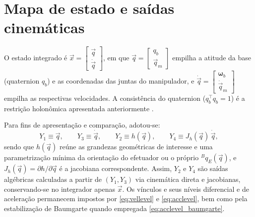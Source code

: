 \section{Mapa de estado e saídas cinemáticas}

O estado integrado é
$\vec x=\begin{bmatrix}\vec q\\ \dot{\vec q}\end{bmatrix}$,
em que $\vec q=\begin{bmatrix} q_b \\ \vec q_m \end{bmatrix}
$ empilha a atitude da base (quaternion $q_b$) e as coordenadas das juntas do manipulador, e
$\dot{\vec q}=\begin{bmatrix} \boldsymbol\omega_b \\ \dot{\vec q}_m \end{bmatrix}$
empilha as respectivas velocidades. 
A consistência do quaternion ($q_b^{\top}q_b=1$)
é a restrição holonômica apresentada anteriormente
.

Para fins de apresentação e comparação, adotou-se: 
\begin{equation}
Y_1 \equiv \vec q,\qquad
Y_3 \equiv \dot{\vec q},\qquad
Y_2 \equiv h(\vec q),\qquad
Y_4 \equiv J_h(\vec q)\,\dot{\vec q},
\label{eq:mapa_estado}
\end{equation}
sendo que $h(\vec q)$ reúne as grandezas geométricas de interesse e uma parametrização mínima da orientação do efetuador ou o próprio
${}^{B}\!q_E(\vec q)$,
e $J_h(\vec q)=\partial h/\partial \vec q$
é a jacobiana correspondente. 
Assim, $Y_2$ e $Y_4$ são saídas algébricas calculadas a partir de $(Y_1,Y_3)$ via cinemática direta e jacobianas,
conservando-se no integrador apenas $\vec x$. 
Os vínculos e seus níveis diferencial e de aceleração permanecem impostos por
\eqref{eq:vellevel} e \eqref{eq:acclevel},
bem como pela estabilização de Baumgarte quando empregada
\eqref{eq:acclevel_baumgarte}.


